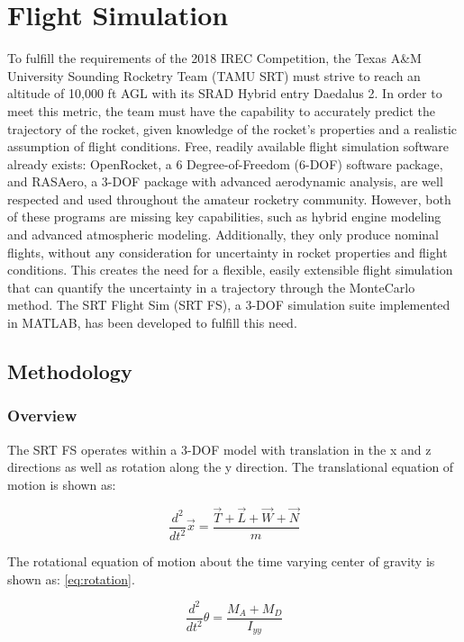 \documentclass[10pt,a4paper]{article}
\begin{document}
	
\section{Flight Simulation}

To fulfill the requirements of the 2018 IREC Competition, the Texas A\&M University Sounding Rocketry Team (TAMU SRT) must strive to reach an altitude of 10,000 ft AGL with its SRAD Hybrid entry Daedalus 2. In order to meet this metric, the team must have the capability to accurately predict the trajectory of the rocket, given knowledge of the rocket's properties and a realistic assumption of flight conditions. Free, readily available flight simulation software already exists: OpenRocket, a 6 Degree-of-Freedom (6-DOF) software package, and RASAero, a 3-DOF package with advanced aerodynamic analysis, are well respected and used throughout the amateur rocketry community. However, both of these programs are missing key capabilities, such as hybrid engine modeling and advanced atmospheric modeling. Additionally, they only produce nominal flights, without any consideration for uncertainty in rocket properties and flight conditions. This creates the need for a flexible, easily extensible flight simulation that can quantify the uncertainty in a trajectory through the MonteCarlo method. The SRT Flight Sim (SRT FS), a 3-DOF simulation suite implemented in MATLAB\textregistered, has been developed to fulfill this need.


\subsection{Methodology}

\subsubsection{Overview}

The SRT FS operates within a 3-DOF model with translation in the x and z directions as well as rotation along the y direction. The translational equation of motion is shown as:

\begin{equation}
\frac{d^2}{dt^2}\vec{x} = \frac{\vec{T}+\vec{L}+\vec{W}+\vec{N}}{m}
\label{eq:translation}
\end{equation}

The rotational equation of motion about the time varying center of gravity is shown as: \ref{eq:rotation}.

\begin{equation}
\frac{d^2}{dt^2}\theta = \frac{M_A+M_D}{I_{yy}}
\label{eq:rotation}
\end{equation}
\end{document}
